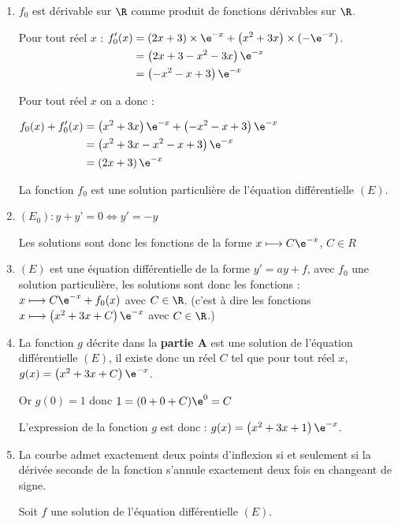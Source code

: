 \begin{enumerate}
\item $f_{0}$ est dérivable sur $\R$ comme produit de fonctions dérivables sur $\R$. 

Pour tout réel $x$ :\quad 
$\begin{aligned}[t] f_0'(x) & = \left(2x+3\right) \times \e^{-x}+ \left(x^2+3x\right)\times (-\e^{-x})\\
	& = \left(2x+3-x^2-3x\right)\e^{-x}\\
	& =\left(-x^2-x+3\right)\e^{-x}
\end{aligned}$.

Pour tout réel $x$ on a donc :

$\begin{aligned} f_0(x)+f_0'(x)& = \left(x^{2}+3 x\right) \e^{-x}+\left(-x^2-x+3\right)\e^{-x}\\
	& = \left(x^{2}+3 x-x^2-x+3\right)\e^{-x}\\
	&=\left(2 x+3\right)\e^{-x}
\end{aligned}$ 

La fonction $f_{0}$  est une solution particulière de l'équation différentielle $(E)$.

	\item  $\left(E_{0}\right): y+y’=0 \iff y'=-y$ 

Les solutions sont donc les fonctions de la forme $x \longmapsto C\e^{-x}$, $C\in R$

	\item $(E)$ est une équation différentielle de la forme $y'=ay+f$, avec $f_0$ une solution particulière, les solutions sont donc les fonctions : \quad $x\longmapsto C\e^{-x } + f_0(x)$ avec $C\in\R$. (c'est à dire les fonctions $x\longmapsto  \left(x^{2}+3 x+C\right) \e^{-x} $  avec $C\in\R$.)
	\item La fonction $g$ décrite dans la \textbf{partie A} est une solution de l'équation différentielle $(E)$, il existe donc un réel $C$ tel que 
pour tout réel $x$, $g(x)= \left(x^{2}+3 x+C\right) \e^{-x} $. 

Or $g(0)=1$ donc $1=(0+0+C)\e^0=C$

L'expression de la fonction $g$ est donc : $g(x)= \left(x^{2}+3 x+1\right) \e^{-x} $. 
	\item La courbe admet exactement deux points d'inflexion si et seulement si la dérivée seconde de la fonction s'annule exactement deux fois en changeant de signe. 

Soit $f$ une solution de l'équation différentielle $(E)$. 


\end{enumerate}
